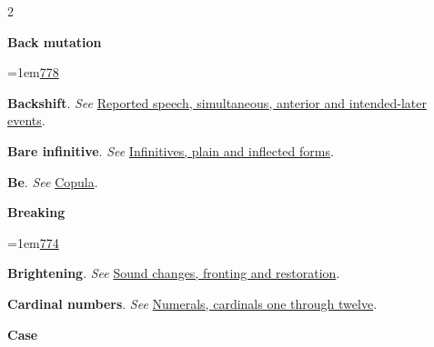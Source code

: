 \begin{multicols}{2}
\par\addvspace{3pt}\noindent\hypertarget{index-28dce19e9a43}{}\textbf{Back mutation}\par\nopagebreak[4]
\par\noindent\hangindent=1em\hspace*{1em}\hyperref[bk-sound-history-learner-bcd0bead7661]{778}\par
{}
\par\addvspace{3pt}\noindent\hypertarget{index-77ae9160b827}{}\textbf{Backshift}. \emph{See} \hyperlink{index-9f7aadf368e6}{Reported speech, simultaneous, anterior and intended-later events}.\par
{}
\par\addvspace{3pt}\noindent\hypertarget{index-8ceb54144db0}{}\textbf{Bare infinitive}. \emph{See} \hyperlink{index-10a0d424f76e}{Infinitives, plain and inflected forms}.\par
{}
\par\addvspace{3pt}\noindent\hypertarget{index-ef014e50b98c}{}\textbf{Be}. \emph{See} \hyperlink{index-0e45f24c3e51}{Copula}.\par
{}
\par\addvspace{3pt}\noindent\hypertarget{index-d4af3c32590c}{}\textbf{Breaking}\par\nopagebreak[4]
\par\noindent\hangindent=1em\hspace*{1em}\hyperref[bk-sound-history-learner-bf4f0271a73a]{774}\par
{}
\par\addvspace{3pt}\noindent\hypertarget{index-1511d6a077bb}{}\textbf{Brightening}. \emph{See} \hyperlink{index-ff2eeaa96a81}{Sound changes, fronting and restoration}.\par
{}
\par{}
\par\addvspace{3pt}\noindent\hypertarget{index-9b18fd3b7908}{}\textbf{Cardinal numbers}. \emph{See} \hyperlink{index-bd34477bd6c9}{Numerals, cardinals one through twelve}.\par
{}
\par\addvspace{3pt}\noindent\hypertarget{index-15f86e24ed25}{}\textbf{Case}\par\nopagebreak[4]

\end{multicols}

